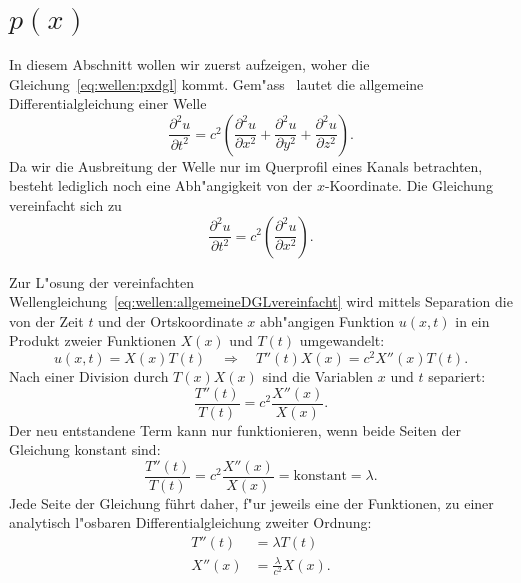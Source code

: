 \section{\texorpdfstring{$p(x)$}{p(x)}}
In diesem Abschnitt wollen wir zuerst aufzeigen, woher die 
Gleichung~\eqref{eq:wellen:pxdgl} kommt. Gem"ass~\cite{wellen:smirnow2} lautet 
die allgemeine Differentialgleichung einer Welle
%
\begin{equation*}
	\frac{\partial^2 u}{\partial t^2}
	=
	c^2
	\left(
		\frac{\partial^2 u}{\partial x^2} 
		+ \frac{\partial^2 u}{\partial y^2} 
		+ \frac{\partial^2 u}{\partial z^2}
	\right).
	\label{eq:wellen:allgemeineDGL}
\end{equation*}
Da wir die Ausbreitung der Welle nur im Querprofil eines Kanals betrachten, 
besteht lediglich noch eine Abh"angigkeit von der $x$-Koordinate. Die Gleichung 
vereinfacht sich zu
\begin{equation}
	\frac{\partial^2 u}{\partial t^2}
	=
	c^2
	\left(
		\frac{\partial^2 u}{\partial x^2} 
	\right).
	\label{eq:wellen:allgemeineDGLvereinfacht}
\end{equation}

Zur L"osung der vereinfachten 
Wellengleichung~\eqref{eq:wellen:allgemeineDGLvereinfacht} wird mittels 
Separation die von der 
Zeit $t$ und der Ortskoordinate $x$ abh"angigen Funktion $u(x,t)$ in ein 
Produkt zweier Funktionen $X(x)$ und $T(t)$ umgewandelt:
\begin{equation*}
	u (x,t) = X(x) T(t)
	\quad
	\Rightarrow\quad T''(t) X(x) = c^2 X''(x)T(t).
\end{equation*}
Nach einer Division durch $T(x)X(x)$ sind die Variablen $x$ und $t$ separiert:
\begin{equation*}
	\frac{T''(t)}{T(t)}
	=
	c^2 \frac{X''(x)}{X(x)}.
\end{equation*}
Der neu entstandene Term kann nur funktionieren, wenn beide Seiten der 
Gleichung konstant sind:
\begin{equation*}
	\frac{T''(t)}{T(t)}
	=
	c^2 \frac{X''(x)}{X(x)} = \text{konstant} = \lambda.
\end{equation*}
Jede Seite der Gleichung führt daher, f"ur jeweils eine der Funktionen, zu 
einer analytisch l"osbaren Differentialgleichung zweiter Ordnung:
\begin{align*}
	T''(t) &= \lambda T(t) \\
	X''(x) &= \frac{\lambda}{c^2}X(x).
\end{align*}

